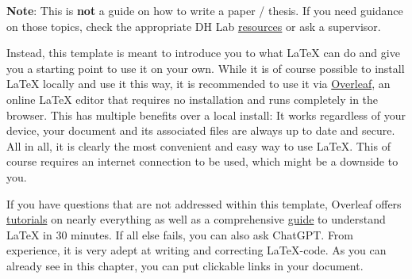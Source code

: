 \documentclass[
  12pt,
  a4paper,
]{article}
\begin{document}
\textbf{Note}: This is \textbf{not} a guide on how to write a paper / thesis. If you need guidance on those topics, check the appropriate DH
Lab \href{https://dhlab.philhist.unibas.ch/en/master-course/seminar-masterarbeit-masterpruefung/}{resources} or ask a supervisor.

Instead, this template is meant to introduce you to what LaTeX can do and give you a starting point to use it on your own. While it is of course possible to install LaTeX locally and use it this way, it is recommended to use it via \href{https://www.overleaf.com}{Overleaf}, an online LaTeX editor that requires no installation and runs completely in the browser. This has multiple benefits over a local install: It works regardless of your device, your document and its associated files are always up to date and secure. All in all, it is clearly the most convenient and easy way to use LaTeX. This of course requires an internet connection to be used, which might be a downside to you.

If you have questions that are not addressed within this template, Overleaf offers \href{https://www.overleaf.com/learn/latex/Tutorials}{tutorials} on nearly everything as well as a comprehensive \href{https://www.overleaf.com/learn/latex/Learn_LaTeX_in_30_minutes}{guide} to understand LaTeX in 30 minutes. If all else fails, you can also ask ChatGPT. From experience, it is very adept at writing and correcting LaTeX-code. As you can already see in this chapter, you can put clickable links in your document.


\end{document}
